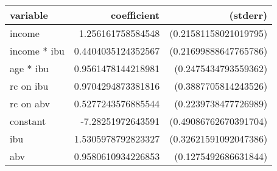 \begin{tabular}{lrr}
\textbf{variable}&\textbf{coefficient}&\textbf{(stderr)}\\
\hline

income&1.256161758584548&(0.21581158021019795)\\
income * ibu&0.4404035124352567&(0.21699888647765786)\\
age * ibu&0.9561478144218981&(0.2475434793559362)\\
rc on ibu&0.9704294873381816&(0.3887705814243526)\\
rc on abv&0.5277243576885544&(0.2239738477726989)\\
constant&-7.28251972643591&(0.49086762670391704)\\
ibu&1.5305978792823327&(0.32621591092047386)\\
abv&0.9580610934226853&(0.1275492686631844)\\
\end{tabular}

